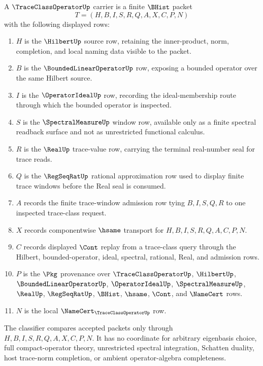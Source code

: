 \begin{definition}
\label{def:trace-class-operator-carrier}
A $\TraceClassOperatorUp$ carrier is a finite $\BHist$ packet
$$
T=(H,B,I,S,R,Q,A,X,C,P,N)
$$
with the following displayed rows:
\begin{enumerate}
\item $H$ is the $\HilbertUp$ source row, retaining the inner-product, norm, completion, and local naming data visible to the packet.
\item $B$ is the $\BoundedLinearOperatorUp$ row, exposing a bounded operator over the same Hilbert source.
\item $I$ is the $\OperatorIdealUp$ row, recording the ideal-membership route through which the bounded operator is inspected.
\item $S$ is the $\SpectralMeasureUp$ window row, available only as a finite spectral readback surface and not as unrestricted functional calculus.
\item $R$ is the $\RealUp$ trace-value row, carrying the terminal real-number seal for trace reads.
\item $Q$ is the $\RegSeqRatUp$ rational approximation row used to display finite trace windows before the Real seal is consumed.
\item $A$ records the finite trace-window admission row tying $B,I,S,Q,R$ to one inspected trace-class request.
\item $X$ records componentwise $\hsame$ transport for $H,B,I,S,R,Q,A,C,P,N$.
\item $C$ records displayed $\Cont$ replay from a trace-class query through the Hilbert, bounded-operator, ideal, spectral, rational, Real, and admission rows.
\item $P$ is the $\Pkg$ provenance over $\TraceClassOperatorUp$, $\HilbertUp$, $\BoundedLinearOperatorUp$, $\OperatorIdealUp$, $\SpectralMeasureUp$, $\RealUp$, $\RegSeqRatUp$, $\BHist$, $\hsame$, $\Cont$, and $\NameCert$ rows.
\item $N$ is the local $\NameCert_{\TraceClassOperatorUp}$ row.
\end{enumerate}
The classifier compares accepted packets only through $H,B,I,S,R,Q,A,X,C,P,N$. It has no coordinate for arbitrary eigenbasis choice, full compact-operator theory, unrestricted spectral integration, Schatten duality, host trace-norm completion, or ambient operator-algebra completeness.
\end{definition}

